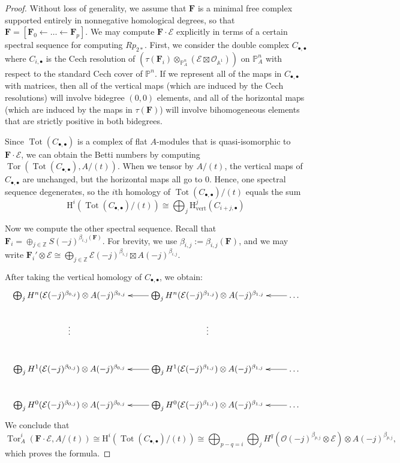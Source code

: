 \documentclass[12pt]{amsart}
\theoremstyle{definition}
\theoremstyle{remark}
\newtheorem{remark}[lemma]{Remark}
\newcommand{\Tor}{\operatorname{Tor}}
\newcommand{\Tot}{\operatorname{Tot}}
\newcommand{\kk}{\Bbbk}
\newcommand{\PP}{\mathbb{P}}
\renewcommand{\AA}{\mathbb{A}}
\newcommand{\HH}{\mathrm{H}}
\newcommand{\ZZ}{\mathbb{Z}}
\newcommand{\cO}{\mathcal{O}}
\newcommand{\cE}{\mathcal{E}}
\newcommand{\FF}{\mathbf{F}}
\begin{document}
\begin{proof}
Without loss of generality, we assume that $\FF$ is a minimal free complex supported entirely in nonnegative homological degrees, so that $\FF=[\FF_0\gets \dots \gets \FF_p]$.  
We may compute $\FF\cdot \cE$ explicitly in terms of a certain spectral sequence for computing $Rp_{2*}$.  First, we consider the double complex $C_{\bullet, \bullet}$ where $C_{i,\bullet}$ is the Cech resolution of $\left( \tau(\FF_i)\otimes_{\PP^n_A} (\cE\boxtimes \cO_{\AA^1})\right)$ on $\PP^n_A$ with respect to the standard Cech cover of $\mathbb P^n$.  If we represent all of the maps in $C_{\bullet, \bullet}$ with matrices, then all of the vertical maps (which are induced by the Cech resolutions) will involve bidegree $(0,0)$ elements, and all of the horizontal maps (which are induced by the maps in $\tau(\FF)$) will involve bihomogeneous elements that are strictly positive in both bidegrees.

Since $\Tot(C_{\bullet, \bullet})$ is a complex of flat $A$-modules that is quasi-isomorphic to $\FF\cdot \cE$, we can obtain the Betti numbers by computing $\Tor(\Tot(C_{\bullet, \bullet}), A/(t))$.  When we tensor by $A/(t)$, the vertical maps of $C_{\bullet, \bullet}$ are unchanged, but the horizontal maps all go to $0$.  
Hence, one spectral sequence degenerates, so the $i$th homology of $\Tot(C_{\bullet,\bullet})/(t)$ equals the sum 
\[
\HH^i(\Tot(C_{\bullet,\bullet})/(t))\cong \bigoplus_{j} \HH^j_{\text{vert}}(C_{i+j,\bullet})
\]

Now we compute the other spectral sequence.
Recall that $\FF_i=\oplus_{j\in \ZZ} S(-j)^{\beta_{i,j}(\FF)}$.  For brevity, we use $\beta_{i,j}:=\beta_{i,j}(\FF)$, and we may write $\FF_i'\otimes \cE\cong \bigoplus_{j\in \ZZ} \cE(-j)^{\beta_{i,j}}\boxtimes A(-j)^{\beta_{i,j}}$.

After taking the vertical homology of $C_{\bullet, \bullet}$, we obtain:
\[
\xymatrix{
\bigoplus_{j} H^n(\cE(-j)^{\beta_{0,j}})\otimes A(-j)^{\beta_{0,j}}&\bigoplus_{j} H^n(\cE(-j)^{\beta_{1,j}})\otimes A(-j)^{\beta_{1,j}}\ar[l]&\dots\ar[l]\\
\vdots & \vdots&\\
\bigoplus_{j} H^1(\cE(-j)^{\beta_{0,j}})\otimes A(-j)^{\beta_{0,j}}&\bigoplus_{j} H^1(\cE(-j)^{\beta_{1,j}})\otimes A(-j)^{\beta_{1,j}}\ar[l]&\dots\ar[l]\\
\bigoplus_{j} H^0( \cE(-j)^{\beta_{0,j}})\otimes A(-j)^{\beta_{0,j}}&\bigoplus_{j} H^0(\cE(-j)^{\beta_{1,j}})\otimes A(-j)^{\beta_{1,j}}\ar[l]&\dots\ar[l]
}
\]
We conclude that
\[
\Tor^i_A(\FF\cdot \cE, A/(t))\cong \HH^i(\Tot(C_{\bullet,\bullet})/(t))\cong \bigoplus_{p-q=i} \bigoplus_{j} H^q(\cO(-j)^{\beta_{p,j}}\otimes \cE)\otimes A(-j)^{\beta_{p,j}},
\]
which proves the formula.
\end{proof}
%
\end{document}
